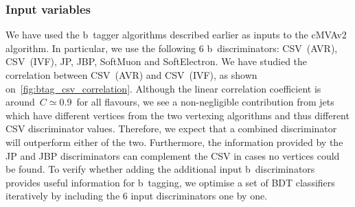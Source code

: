 \subsubsection{Input variables}
We have used the b~tagger algorithms described earlier as inputs to the cMVAv2 algorithm. In particular, we use the following 6 b~discriminators: CSV~(AVR), CSV~(IVF), JP, JBP, SoftMuon and SoftElectron. We have studied the correlation between CSV~(AVR) and CSV~(IVF), as shown on~\cref{fig:btag_csv_correlation}. Although the linear correlation coefficient is around~$C \simeq 0.9$~for all flavours, we see a non-negligible contribution from jets which have different vertices from the two vertexing algorithms and thus different CSV discriminator values. Therefore, we expect that a combined discriminator will outperform either of the two. Furthermore, the information provided by the JP and JBP discriminators can complement the CSV in cases no vertices could be found. To verify whether adding the additional input b~discriminators provides useful information for b~tagging, we optimise a set of BDT classifiers iteratively by including the 6 input discriminators one by one.

